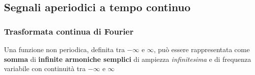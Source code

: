 \documentclass[
  paper=a4,
  ,captions=tableheading
]{scrartcl}
\renewenvironment{quote}{\begin{customblockquote}\list{}{\rightmargin=0em\leftmargin=0em}%
\item\relax\color{blockquote-text}\ignorespaces}{\unskip\unskip\endlist\end{customblockquote}}
\begin{document}
\subsection{Segnali aperiodici a tempo
continuo}\label{segnali-aperiodici-a-tempo-continuo}

\subsubsection{Trasformata continua di
Fourier}\label{trasformata-continua-di-fourier}

\begin{quote}
Una funzione non periodica, definita tra \(-\infty\) e \(\infty\), può
essere rappresentata come \textbf{somma} di \textbf{infinite armoniche
semplici} di ampiezza \emph{infinitesima} e di frequenza variabile con
continuità tra \(-\infty\) e \(\infty\)
\end{quote}
\end{document}
